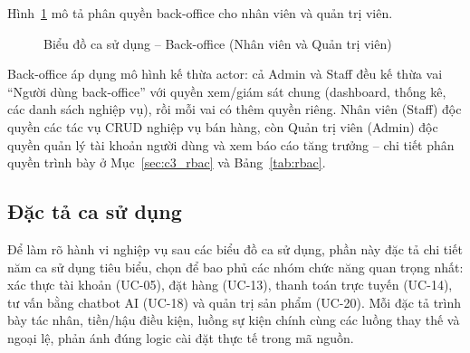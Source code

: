 Hình~\ref{fig:usecase_overview_admin} mô tả phân quyền back-office cho nhân viên và quản trị viên.

\begin{figure}[H]
  \centering
  \caption{Biểu đồ ca sử dụng -- Back-office (Nhân viên và Quản trị viên)}
  \label{fig:usecase_overview_admin}
\end{figure}

Back-office áp dụng mô hình kế thừa actor: cả Admin và Staff đều kế thừa vai ``Người dùng back-office'' với quyền xem\slash giám sát chung (dashboard, thống kê, các danh sách nghiệp vụ), rồi mỗi vai có thêm quyền riêng. Nhân viên (Staff) độc quyền các tác vụ CRUD nghiệp vụ bán hàng, còn Quản trị viên (Admin) độc quyền quản lý tài khoản người dùng và xem báo cáo tăng trưởng -- chi tiết phân quyền trình bày ở Mục~\ref{sec:c3_rbac} và Bảng~\ref{tab:rbac}.

\subsection{Đặc tả ca sử dụng}
\label{sec:c3_usecase_spec}

Để làm rõ hành vi nghiệp vụ sau các biểu đồ ca sử dụng, phần này đặc tả chi tiết năm ca sử dụng tiêu biểu, chọn để bao phủ các nhóm chức năng quan trọng nhất: xác thực tài khoản (UC-05), đặt hàng (UC-13), thanh toán trực tuyến (UC-14), tư vấn bằng chatbot AI (UC-18) và quản trị sản phẩm (UC-20). Mỗi đặc tả trình bày tác nhân, tiền\slash hậu điều kiện, luồng sự kiện chính cùng các luồng thay thế và ngoại lệ, phản ánh đúng logic cài đặt thực tế trong mã nguồn.

